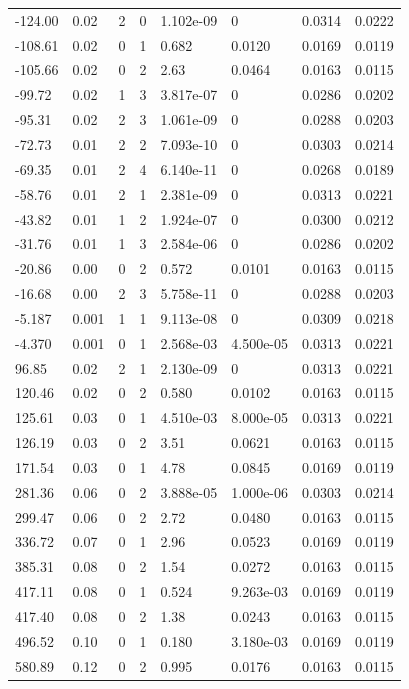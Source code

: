 \documentclass[preview]{standalone}
\begin{document}
{{\begin{tabular}{L{1.2cm}C{1.2cm} C{0.3cm}C{0.5cm} C{1.4cm}C{1.4cm} C{1.4cm}C{1.4cm}}
  -124.00  &  0.02  & 2     &  0 &  1.102e-09  & 0  & 0.0314 &  0.0222   \\ 
  -108.61  &  0.02  & 0     &  1 &  0.682  & 0.0120  & 0.0169 &  0.0119   \\ 
  -105.66  &  0.02  & 0     &  2 &  2.63  & 0.0464  & 0.0163 &  0.0115   \\ 
  -99.72  &  0.02  & 1     &  3 &  3.817e-07  & 0  & 0.0286 &  0.0202   \\ 
  -95.31  &  0.02  & 2     &  3 &  1.061e-09  & 0  & 0.0288 &  0.0203   \\ 
  -72.73  &  0.01  & 2     &  2 &  7.093e-10  & 0  & 0.0303 &  0.0214   \\ 
  -69.35  &  0.01  & 2     &  4 &  6.140e-11  & 0  & 0.0268 &  0.0189   \\ 
  -58.76  &  0.01  & 2     &  1 &  2.381e-09  & 0  & 0.0313 &  0.0221   \\ 
  -43.82  &  0.01  & 1     &  2 &  1.924e-07  & 0  & 0.0300 &  0.0212   \\ 
  -31.76  &  0.01  & 1     &  3 &  2.584e-06  & 0  & 0.0286 &  0.0202   \\ 
  -20.86  &  0.00  & 0     &  2 &  0.572  & 0.0101  & 0.0163 &  0.0115   \\ 
  -16.68  &  0.00  & 2     &  3 &  5.758e-11  & 0  & 0.0288 &  0.0203   \\ 
  -5.187  &  0.001  & 1     &  1 &  9.113e-08  & 0  & 0.0309 &  0.0218   \\ 
  -4.370  &  0.001  & 0     &  1 &  2.568e-03  & 4.500e-05  & 0.0313 &  0.0221   \\ 
  96.85  &  0.02  & 2     &  1 &  2.130e-09  & 0  & 0.0313 &  0.0221   \\ 
  120.46  &  0.02  & 0     &  2 &  0.580  & 0.0102  & 0.0163 &  0.0115   \\ 
  125.61  &  0.03  & 0     &  1 &  4.510e-03  & 8.000e-05  & 0.0313 &  0.0221   \\ 
  126.19  &  0.03  & 0     &  2 &  3.51  & 0.0621  & 0.0163 &  0.0115   \\ 
  171.54  &  0.03  & 0     &  1 &  4.78  & 0.0845  & 0.0169 &  0.0119   \\ 
  281.36  &  0.06  & 0     &  2 &  3.888e-05  & 1.000e-06  & 0.0303 &  0.0214   \\ 
  299.47  &  0.06  & 0     &  2 &  2.72  & 0.0480  & 0.0163 &  0.0115   \\ 
  336.72  &  0.07  & 0     &  1 &  2.96  & 0.0523  & 0.0169 &  0.0119   \\ 
  385.31  &  0.08  & 0     &  2 &  1.54  & 0.0272  & 0.0163 &  0.0115   \\ 
  417.11  &  0.08  & 0     &  1 &  0.524  & 9.263e-03  & 0.0169 &  0.0119   \\ 
  417.40  &  0.08  & 0     &  2 &  1.38  & 0.0243  & 0.0163 &  0.0115   \\ 
  496.52  &  0.10  & 0     &  1 &  0.180  & 3.180e-03  & 0.0169 &  0.0119   \\ 
  580.89  &  0.12  & 0     &  2 &  0.995  & 0.0176  & 0.0163 &  0.0115   \\ 
\hline 
\end{tabular} 

}}
\end{document}
